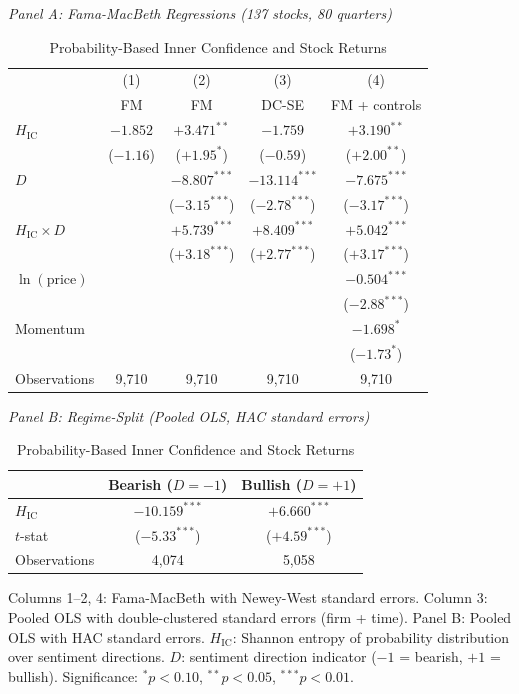 \documentclass[12pt,a4paper]{article}
\begin{document}
\begin{table}[H]
\centering
\caption{Probability-Based Inner Confidence and Stock Returns}
\label{tab:ic_fm}
\small
\textit{Panel A: Fama-MacBeth Regressions (137 stocks, 80 quarters)}
\begin{tabular}{lcccc}
\toprule
 & (1) & (2) & (3) & (4) \\
 & FM & FM & DC-SE & FM + controls \\
\midrule
$H_{\text{IC}}$ & $-1.852$ & $+3.471^{**}$ & $-1.759$ & $+3.190^{**}$ \\
 & ($-1.16$) & ($+1.95^{*}$) & ($-0.59$) & ($+2.00^{**}$) \\
$D$ & & $-8.807^{***}$ & $-13.114^{***}$ & $-7.675^{***}$ \\
 & & ($-3.15^{***}$) & ($-2.78^{***}$) & ($-3.17^{***}$) \\
$H_{\text{IC}} \times D$ & & $+5.739^{***}$ & $+8.409^{***}$ & $+5.042^{***}$ \\
 & & ($+3.18^{***}$) & ($+2.77^{***}$) & ($+3.17^{***}$) \\
$\ln(\text{price})$ & & & & $-0.504^{***}$ \\
 & & & & ($-2.88^{***}$) \\
Momentum & & & & $-1.698^{*}$ \\
 & & & & ($-1.73^{*}$) \\
\midrule
Observations & 9,710 & 9,710 & 9,710 & 9,710 \\
\bottomrule
\end{tabular}

\vspace{6pt}
\textit{Panel B: Regime-Split (Pooled OLS, HAC standard errors)}
\begin{tabular}{lcc}
\toprule
 & Bearish ($D = -1$) & Bullish ($D = +1$) \\
\midrule
$H_{\text{IC}}$ & $-10.159^{***}$ & $+6.660^{***}$ \\
$t$-stat & ($-5.33^{***}$) & ($+4.59^{***}$) \\
Observations & 4,074 & 5,058 \\
\bottomrule
\end{tabular}

\vspace{4pt}
\footnotesize Columns 1--2, 4: Fama-MacBeth with Newey-West standard errors. Column 3: Pooled OLS with double-clustered standard errors (firm + time). Panel B: Pooled OLS with HAC standard errors. $H_{\text{IC}}$: Shannon entropy of probability distribution over sentiment directions. $D$: sentiment direction indicator ($-1$ = bearish, $+1$ = bullish). Significance: $^{*}p < 0.10$, $^{**}p < 0.05$, $^{***}p < 0.01$.
\end{table}
\end{document}
